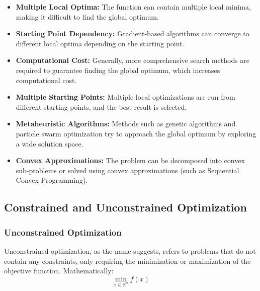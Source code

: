 \begin{itemize}
    \item \textbf{Multiple Local Optima:} The function can contain multiple local minima, making it difficult to find the global optimum.
    \item \textbf{Starting Point Dependency:} Gradient-based algorithms can converge to different local optima depending on the starting point.
    \item \textbf{Computational Cost:} Generally, more comprehensive search methods are required to guarantee finding the global optimum, which increases computational cost.
\end{itemize}

\begin{tcolorbox}[title=Approaches to Non-convex Problems]
\begin{itemize}
    \item \textbf{Multiple Starting Points:} Multiple local optimizations are run from different starting points, and the best result is selected.
    \item \textbf{Metaheuristic Algorithms:} Methods such as genetic algorithms and particle swarm optimization try to approach the global optimum by exploring a wide solution space.
    \item \textbf{Convex Approximations:} The problem can be decomposed into convex sub-problems or solved using convex approximations (such as Sequential Convex Programming).
\end{itemize}
\end{tcolorbox}

\subsection{Constrained and Unconstrained Optimization}

\subsubsection{Unconstrained Optimization}
Unconstrained optimization, as the name suggests, refers to problems that do not contain any constraints, only requiring the minimization or maximization of the objective function. Mathematically:
\begin{equation}
\min_{x \in \mathbb{R}^n} f(x)
\end{equation}


